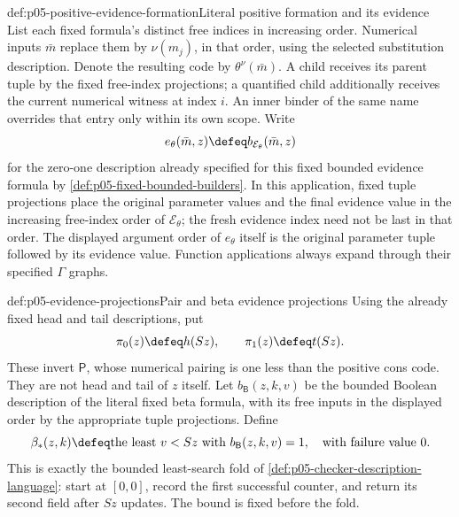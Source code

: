 \begin{hbdefinition}{def:p05-positive-evidence-formation}{Literal positive formation and its evidence}
List each fixed formula's distinct free indices in increasing order.
Numerical inputs \(\bar m\) replace them by \(\nu(m_j)\), in that
order, using the selected substitution description. Denote the resulting
code by \(\theta^\nu(\bar m)\). A child receives its parent tuple
by the fixed free-index projections; a quantified child additionally
receives the current numerical witness at index \(i\). An inner binder
of the same name overrides that entry only within its own scope.
Write
\[
       e_\theta(\bar m,z)\defeq
                  b_{\mathcal E_\theta}(\bar m,z)
\]
for the zero-one description already specified for this fixed bounded
evidence formula by \cref{def:p05-fixed-bounded-builders}. In this
application, fixed tuple projections place the original parameter values
and the final evidence value in the increasing free-index order of
\(\mathcal E_\theta\); the fresh evidence index need not be last in
that order. The displayed argument order of \(e_\theta\) itself is
the original parameter tuple followed by its evidence value. Function
applications always expand through their specified \(\Gamma\) graphs.
\end{hbdefinition}

\begin{hbdefinition}{def:p05-evidence-projections}{Pair and beta evidence projections}
Using the already fixed head and tail descriptions, put
\[
       \pi_0(z)\defeq h(Sz),\qquad \pi_1(z)\defeq t(Sz).
\]
These invert \(\mathsf P\), whose numerical pairing is one less than
the positive cons code. They are not head and tail of \(z\) itself.
Let \(b_{\mathsf B}(z,k,v)\) be the bounded Boolean description of the
literal fixed beta formula, with its free inputs in the displayed order
by the appropriate tuple projections. Define
\[
 \beta_*(z,k)\defeq
       \text{the least }v<Sz\text{ with }b_{\mathsf B}(z,k,v)=1,
       \quad\text{with failure value }0.
\]
This is exactly the bounded least-search fold of
\cref{def:p05-checker-description-language}: start at \([0,0]\),
record the first successful counter, and return its second field after
\(Sz\) updates. The bound is fixed before the fold.
\end{hbdefinition}

